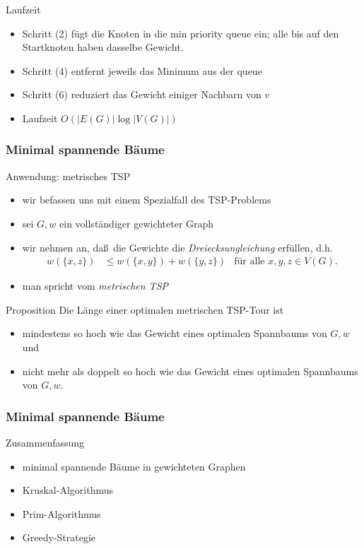 \documentclass[aspectratio=1610, 11pt]{beamer}
\newcommand{\mytitle}{Minimal spannende B\"aume}
\begin{document}
\begin{frame}
\begin{overprint}
\begin{exampleblock}{Laufzeit}
\begin{itemize}
		\item Schritt (2) f\"ugt die Knoten in die min priority queue ein; alle bis auf den Startknoten haben dasselbe Gewicht.
			\item Schritt (4) entfernt jeweils das Minimum aus der queue
			\item Schritt (6) reduziert das Gewicht einiger Nachbarn von $v$
				\item Laufzeit $O(|E(G)|\log|V(G)|)$
	\end{itemize}
\end{exampleblock}
	\end{overprint}
\end{frame}


\begin{frame}\frametitle{\mytitle}
	\begin{overprint}
		\begin{exampleblock}{Anwendung: metrisches TSP}
			\begin{itemize}
\item  wir befassen uns mit einem Spezialfall des TSP-Problems
	\item  sei $G,w$ ein vollst\"andiger gewichteter Graph
	\item wir nehmen an, da\ss\ die Gewichte die {\em Dreiecksungleichung} erf\"ullen, d.h.\
\begin{align*}
	w(\{x,z\})&\leq w(\{x,y\})+w(\{y,z\})&\mbox{f\"ur alle }x,y,z\in V(G).
\end{align*}
\item man spricht vom {\em metrischen TSP}
			\end{itemize}
\end{exampleblock}
		\begin{block}{Proposition}
	Die L\"ange einer optimalen metrischen TSP-Tour ist
	\begin{itemize}
		\item mindestens so hoch wie das Gewicht eines optimalen Spannbaums von $G,w$ und
		\item nicht mehr als doppelt so hoch wie das Gewicht eines optimalen Spannbaums von $G,w$.
	\end{itemize}
\end{block}
	\end{overprint}
\end{frame}

\begin{frame}\frametitle{\mytitle}
	\begin{exampleblock}{Zusammenfassung}
		\begin{itemize}
			\item minimal spannende B\"aume in gewichteten Graphen
			\item Kruskal-Algorithmus
			\item Prim-Algorithmus
			\item Greedy-Strategie
		\end{itemize}
	\end{exampleblock}
\end{frame}
\end{document}

